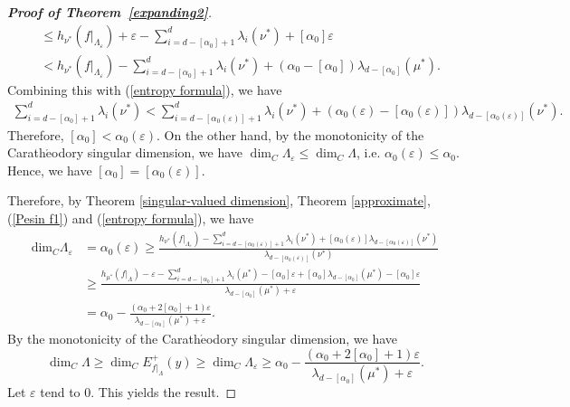 \documentclass[11pt,a4paper]{amsart}
\theoremstyle{plain}
\theoremstyle{remark}
\begin{document}
\begin{proof}[\textbf{Proof of Theorem~\ref{expanding2}}]
\begin{align*}
			&\leq h_{\nu^{\ast}}(f|_{\Lambda_{\varepsilon}})+\varepsilon-\sum^{d}_{i=d-[\alpha_{0}]+1}\lambda_{i}(\nu^{\ast})+[\alpha_{0}]\varepsilon\\
			&< h_{\nu^{\ast}}(f|_{\Lambda_{\varepsilon}})-\sum^{d}_{i=d-[\alpha_{0}]+1}\lambda_{i}(\nu^{\ast})+(\alpha_{0}-[\alpha_{0}])\lambda_{d-[\alpha_{0}]}(\mu^{\ast}).
		\end{align*}
		Combining this with (\ref{entropy formula}), we have \begin{align*}
			\sum^{d}_{i=d-[\alpha_{0}]+1}\lambda_{i}(\nu^{\ast})<\sum^{d}_{i=d-[\alpha_{0}(\varepsilon)]+1}\lambda_{i}(\nu^{\ast})+(\alpha_{0}(\varepsilon)-[\alpha_{0}(\varepsilon)])\lambda_{d-[\alpha_{0}(\varepsilon)]}(\nu^{\ast}).
		\end{align*}
		Therefore,
		$[\alpha_{0}]< \alpha_{0}(\varepsilon)$.
		On the other hand, by the monotonicity of the Carath$\acute{\text{e}}$odory singular dimension, we have $\dim_{C}\Lambda_{\varepsilon}\leq \dim_{C}\Lambda$, i.e. $\alpha_{0}(\varepsilon)\leq \alpha_{0}$. Hence, we have $[\alpha_{0}]=[\alpha_{0}(\varepsilon)]$.
		
		Therefore, by Theorem \ref{singular-valued dimension},  Theorem \ref{approximate}, (\ref{Pesin f1}) and (\ref{entropy formula}), we have
		\begin{align*}
			\text{dim}_{C}\Lambda_{\varepsilon}&=\alpha_{0}(\varepsilon)\geq\frac{h_{\nu^{\ast}}(f|_{\Lambda_{\varepsilon}})-\sum^{d}_{i=d-[\alpha_{0}(\varepsilon)]+1}\lambda_{i}(\nu^{\ast})+[\alpha_{0}(\varepsilon)]\lambda_{d-[\alpha_{0}(\varepsilon)]}(\nu^{\ast})}{\lambda_{d-[\alpha_{0}(\varepsilon)]}(\nu^{\ast})}\\
			&\geq\frac{h_{\mu^{\ast}}(f|_{\Lambda})-\varepsilon-\sum^{d}_{i=d-[\alpha_{0}]+1}\lambda_{i}(\mu^{\ast})-[\alpha_{0}]\varepsilon+[\alpha_{0}]\lambda_{d-[\alpha_{0}]}(\mu^{\ast})-[\alpha_{0}]\varepsilon}{\lambda_{d-[\alpha_{0}]}(\mu^{\ast})+\varepsilon}\\
			&=\alpha_{0}-\frac{(\alpha_{0}+2[\alpha_{0}]+1)\varepsilon}{\lambda_{d-[\alpha_{0}]}(\mu^{\ast})+\varepsilon}.
		\end{align*}
		By the monotonicity of the Carath$\acute{\text{e}}$odory singular dimension, we have $$\dim_{C}\Lambda\geq \dim_{C} E^{+}_{f|_{\Lambda}}(y)\geq \dim_{C}\Lambda_{\varepsilon}\geq \alpha_{0}-\frac{(\alpha_{0}+2[\alpha_{0}]+1)\varepsilon}{\lambda_{d-[\alpha_{0}]}(\mu^{\ast})+\varepsilon}.$$ Let $\varepsilon$ tend to $0$. This yields the result.
		

\end{proof}
\end{document}
